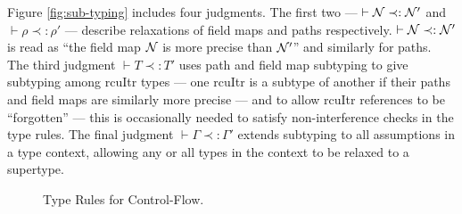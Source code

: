 Figure \ref{fig:sub-typing} includes four judgments.  The first two --- $\vdash\mathcal{N}\prec:\mathcal{N}'$ and $\vdash\rho\prec:\rho'$ --- describe relaxations of field maps and paths respectively.  $\vdash\mathcal{N}\prec:\mathcal{N}'$ is read as ``the field map $\mathcal{N}$ is more precise than $\mathcal{N}'$'' and similarly for paths.
The third judgment $\vdash T\prec:T'$ uses path and field map subtyping to give subtyping among \textsf{rcuItr} types --- one \textsf{rcuItr} is a subtype of another if their paths and field maps are similarly more precise --- and to allow \textsf{rcuItr} references to be ``forgotten'' --- this is occasionally needed to satisfy non-interference checks in the type rules.
The final judgment $\vdash\Gamma\prec:\Gamma'$ extends subtyping to all assumptions in a type context, allowing any or all types in the context to be relaxed to a supertype.
\begin{figure}[!t]\scriptsize
{}
\vspace{-2em}
\caption{Type Rules for Control-Flow.}
\label{fig:type-judgements-for-cf}
\end{figure}

